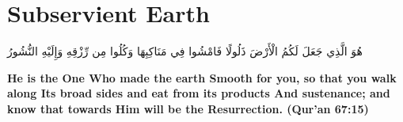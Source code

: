 \chapter{Subservient Earth}
\begin{center}
    {\Huge    
        \begin{Arabic}
            هُوَ الَّذِي جَعَلَ لَكُمُ الْأَرْضَ ذَلُولًا فَامْشُوا فِي مَنَاكِبِهَا وَكُلُوا مِن رِّزْقِهِ وَإِلَيْهِ النُّشُورُ
        \end{Arabic}
    }
\end{center}
\vspace*{\fill}
\vspace{3cm}
\begin{center}
    \large \textbf{He is the One Who made the earth Smooth for you, so that you walk along Its broad sides and eat from its products And sustenance; and know that towards Him will be the Resurrection. (Qur'an 67:15)}
\end{center}
